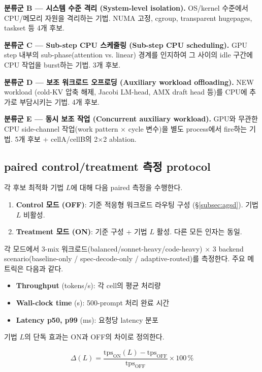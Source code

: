 \textbf{분류군 B --- 시스템 수준 격리 (System-level isolation).}
OS/kernel 수준에서 CPU/메모리 자원을 격리하는 기법. NUMA 고정, cgroup, transparent hugepages, taskset 등 4개 후보.

\textbf{분류군 C --- Sub-step CPU 스케줄링 (Sub-step CPU scheduling).}
GPU step 내부의 sub-phase(attention vs. linear) 경계를 인지하여 그 사이의 idle 구간에 CPU 작업을 burst하는 기법. 3개 후보.

\textbf{분류군 D --- 보조 워크로드 오프로딩 (Auxiliary workload offloading).}
NEW workload (cold-KV 압축 해제, Jacobi LM-head, AMX draft head 등)를 CPU에 추가로 부담시키는 기법. 4개 후보.

\textbf{분류군 E --- 동시 보조 작업 (Concurrent auxiliary workload).}
GPU와 무관한 CPU side-channel 작업(work pattern $\times$ cycle 변수)을 별도 process에서 fire하는 기법. 5개 후보 + cellA/cellB의 2$\times$2 ablation.

\subsection{paired control/treatment 측정 protocol}
\label{subsec:protocol}

각 후보 최적화 기법 $L$에 대해 다음 paired 측정을 수행한다.

\begin{enumerate}
  \item \textbf{Control 모드 (OFF)}: 기준 적응형 워크로드 라우팅 구성 (\S\ref{subsec:agsd}). 기법 $L$ 비활성.
  \item \textbf{Treatment 모드 (ON)}: 기준 구성 + 기법 $L$ 활성. 다른 모든 인자는 동일.
\end{enumerate}

각 모드에서 3-mix 워크로드(balanced/sonnet-heavy/code-heavy) $\times$ 3 backend scenario(baseline-only / spec-decode-only / adaptive-routed)를 측정한다.
주요 메트릭은 다음과 같다.

\begin{itemize}
  \item \textbf{Throughput} (tokens/s): 각 cell의 평균 처리량
  \item \textbf{Wall-clock time} (s): 500-prompt 처리 완료 시간
  \item \textbf{Latency p50, p99} (ms): 요청당 latency 분포
\end{itemize}

기법 $L$의 단독 효과는 ON과 OFF의 차이로 정의한다.

\begin{equation}
\Delta(L) = \frac{\text{tps}_{\text{ON}}(L) - \text{tps}_{\text{OFF}}}{\text{tps}_{\text{OFF}}} \times 100\,\%
\end{equation}

